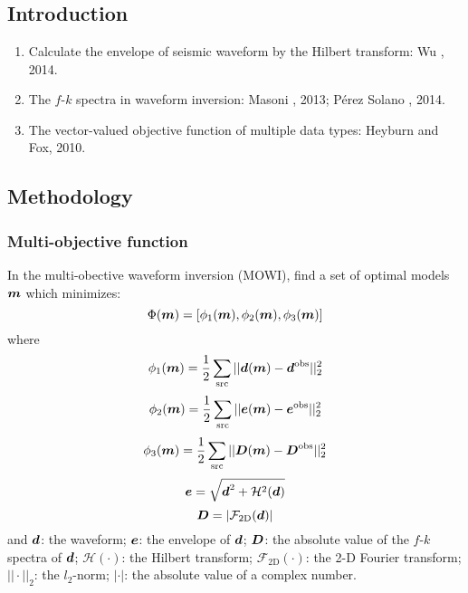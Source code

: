 \renewcommand{\pmk}{PanYD\_2020\_GJI\_Multi-objective waveform inversion}
\renewcommand{\prf}{FWI/\pmk.pdf}
\renewcommand{\pti}{Multi-objective waveform inversion of
  shallow seismic wavefields}
\renewcommand{\pay}{Yudi Pan, Lingli Gao and Renat Shigapov, 2020}
\renewcommand{\pjo}{Geophys. J. Int.}
\renewcommand{\pda}{2020/4/28 Tue.}

\section{\pinfo}

\subsection{Introduction}
\begin{enumerate}[\hspace{10mm}*]
  \item Calculate the envelope of seismic waveform by the Hilbert transform:
    Wu \etal, 2014.
  \item The $f$-$k$ spectra in waveform inversion: Masoni \etal, 2013;
    P\'erez Solano \etal, 2014.
  \item The vector-valued objective function of multiple data types:
    Heyburn and Fox, 2010.
\end{enumerate}

\subsection{Methodology}
\subsubsection{Multi-objective function}
In the multi-obective waveform inversion (MOWI),
find a set of optimal models $\boldsymbol{m}$ which minimizes:
\[ \Phi(\boldsymbol{m}) = [ \phi_1(\boldsymbol{m}), \phi_2(\boldsymbol{m}), \phi_3(\boldsymbol{m}) ] \]
where
\[ \phi_1(\boldsymbol{m}) = \frac{1}{2} \sum_\text{src}
  || \boldsymbol{d}(\boldsymbol{m}) - \boldsymbol{d}^\text{obs} ||_2^2 \]
\[ \phi_2(\boldsymbol{m}) = \frac{1}{2} \sum_\text{src}
  || \boldsymbol{e}(\boldsymbol{m}) - \boldsymbol{e}^\text{obs} ||_2^2 \]
\[ \phi_3(\boldsymbol{m}) = \frac{1}{2} \sum_\text{src}
  || \boldsymbol{D}(\boldsymbol{m}) - \boldsymbol{D}^\text{obs} ||_2^2 \]
\[ \boldsymbol{e} = \sqrt{\boldsymbol{d}^2 + \mathcal H^2(\boldsymbol{d})} \]
\[ \boldsymbol{D} = | \mathcal F_\text{2D}(\boldsymbol{d}) | \]
and $\boldsymbol{d}$: the waveform;
$\boldsymbol{e}$: the envelope of $\boldsymbol{d}$;
$\boldsymbol{D}$: the absolute value of the $f$-$k$ spectra of $\boldsymbol{d}$;
$\mathcal H(\cdot)$: the Hilbert transform;
$\mathcal F_\text{2D}(\cdot)$: the 2-D Fourier transform;
$||\cdot||_2$: the $l_2$-norm;
$|\cdot|$: the absolute value of a complex number.

